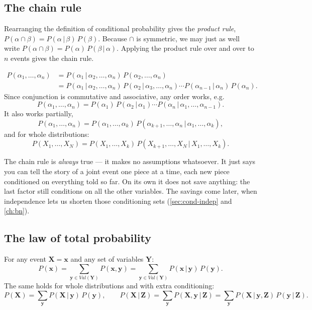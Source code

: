 \documentclass[11pt, oneside]{book}
\newcommand{\Prob}{\mathbb{P}}           %
\newcommand{\given}{\,\vert\,}           %
\newcommand{\Val}{\mathit{Val}}          %
\newcommand{\bX}{\mathbf{X}}  \newcommand{\bY}{\mathbf{Y}}
\newcommand{\bZ}{\mathbf{Z}}  \newcommand{\bE}{\mathbf{E}}
\newcommand{\bx}{\mathbf{x}}  \newcommand{\by}{\mathbf{y}}
\let\originalsubsection\subsection
\renewcommand{\subsection}{\Needspace{6\baselineskip}\originalsubsection}
\begin{document}
\subsection{The chain rule}

Rearranging the definition of conditional probability gives the
\emph{product rule}, $P(\alpha \cap \beta) = P(\alpha \given \beta)\,P(\beta)$.
Because $\cap$ is symmetric, we may just as well write
$P(\alpha \cap \beta) = P(\alpha)\,P(\beta \given \alpha)$. Applying the
product rule over and over to $n$ events gives the chain rule.

\begin{thmbox}[title={Chain rule}, unbreakable]
\begin{align*}
P(\alpha_1, \ldots, \alpha_n)
&= P(\alpha_1 \given \alpha_2, \ldots, \alpha_n)\, P(\alpha_2, \ldots, \alpha_n) \\
&= P(\alpha_1 \given \alpha_2, \ldots, \alpha_n)\,
  P(\alpha_2 \given \alpha_3, \ldots, \alpha_n) \cdots
  P(\alpha_{n-1} \given \alpha_n)\, P(\alpha_n).
\end{align*}
Since conjunction is commutative and associative, any order works, e.g.
\[
P(\alpha_1, \ldots, \alpha_n) = P(\alpha_1)\,P(\alpha_2 \given \alpha_1) \cdots
P(\alpha_n \given \alpha_1, \ldots, \alpha_{n-1}).
\]
It also works partially,
\[
P(\alpha_1, \ldots, \alpha_n) = P(\alpha_1, \ldots, \alpha_k)\,
P(\alpha_{k+1}, \ldots, \alpha_n \given \alpha_1, \ldots, \alpha_k),
\]
and for whole distributions:
\[
P(X_1, \ldots, X_N) = P(X_1, \ldots, X_k)\,
P(X_{k+1}, \ldots, X_N \given X_1, \ldots, X_k).
\]
\end{thmbox}

The chain rule is \emph{always} true --- it makes no assumptions whatsoever. It
just says you can tell the story of a joint event one piece at a time, each new
piece conditioned on everything told so far. On its own it does not save
anything: the last factor still conditions on all the other variables. The
savings come later, when independence lets us shorten those conditioning sets
(\cref{sec:cond-indep} and \cref{ch:bn}).

\subsection{The law of total probability}

\begin{thmbox}[title={Law of total probability}]
For any event $\bX = \bx$ and any set of variables $\bY$:
\[
P(\bx) = \sum_{\by \in \Val(\bY)} P(\bx, \by)
       = \sum_{\by \in \Val(\bY)} P(\bx \given \by)\, P(\by).
\]
The same holds for whole distributions and with extra conditioning:
\[
P(\bX) = \sum_{\by} P(\bX \given \by)\, P(\by), \qquad
P(\bX \given \bZ) = \sum_{\by} P(\bX, \by \given \bZ)
                  = \sum_{\by} P(\bX \given \by, \bZ)\, P(\by \given \bZ).
\]
\end{thmbox}
\end{document}
